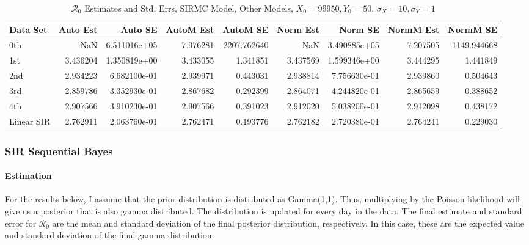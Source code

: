 \documentclass[12pt]{article}
\newcommand{\rr}{\ensuremath{\mathcal{R}_0}}
\begin{document}
\begin{table}[H]
	
	\caption{$\rr$ Estimates and Std. Errs, SIRMC Model,
		Other Models, $X_0 = 99950, Y_0 = 50$, 
		$\sigma_X = 10, \sigma_Y = 1$}
	\begin{footnotesize}
		\hskip -1cm
		\begin{tabular}{l|r|r|r|r|r|r|r|r}
			\hline
			Data Set & Auto Est & Auto SE & AutoM Est & AutoM SE & Norm Est & Norm SE & NormM Est & NormM SE\\
			\hline
			0th & NaN & 6.511016e+05 & 7.976281 & 2207.762640 & NaN & 3.490885e+05 & 7.207505 & 1149.944668\\
			\hline
			1st & 3.436204 & 1.350819e+00 & 3.433055 & 1.341851 & 3.437569 & 1.599346e+00 & 3.444295 & 1.441849\\
			\hline
			2nd & 2.934223 & 6.682100e-01 & 2.939971 & 0.443031 & 2.938814 & 7.756630e-01 & 2.939860 & 0.504643\\
			\hline
			3rd & 2.859786 & 3.352930e-01 & 2.867682 & 0.292399 & 2.864071 & 4.244820e-01 & 2.865659 & 0.388652\\
			\hline
			4th & 2.907566 & 3.910230e-01 & 2.907566 & 0.391023 & 2.912020 & 5.038200e-01 & 2.912098 & 0.438172\\
			\hline
			Linear SIR & 2.762911 & 2.063760e-01 & 2.762471 & 0.193776 & 2.762182 & 2.720380e-01 & 2.764241 & 0.229030\\
			\hline
		\end{tabular}
	\end{footnotesize}
\end{table}

\subsubsection{SIR Sequential Bayes}

\paragraph{Estimation}

For the results below, I assume that the prior distribution is distributed as Gamma(1,1). Thus, multiplying by the Poisson likelihood will give us a posterior that is also gamma distributed. The distribution is updated for every day in the data. The final estimate and standard error for $\rr$ are the mean and standard deviation of the final posterior distribution, respectively. In this case, these are the expected value and standard deviation of the final gamma distribution. 
\end{document}
